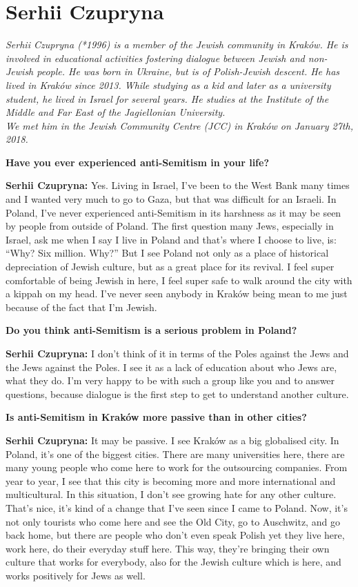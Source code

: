 \section{Serhii Czupryna}

\textit{Serhii Czupryna (*1996) is a member of the Jewish community in Kraków. He is involved in educational activities fostering dialogue between Jewish and non-Jewish people. He was born in Ukraine, but is of Polish-Jewish descent. He has lived in Kraków since 2013. While studying as a kid and later as a university student, he lived in Israel for several years. He studies at the Institute of the Middle and Far East of the Jagiellonian University. \\
We met him in the Jewish Community Centre (JCC) in Kraków on January 27th, 2018.}\par
\vspace*{2em}
\textbf{Have you ever experienced anti-Semitism in your life?}\par
\textbf{Serhii Czupryna:} Yes. Living in Israel, I’ve been to the West Bank many times and I wanted very much to go to Gaza, but that was difficult for an Israeli. In Poland, I’ve never experienced anti-Semitism in its harshness as it may be seen by people from outside of Poland. The first question many Jews, especially in Israel, ask me when I say I live in Poland and that’s where I choose to live, is: ``Why? Six million. Why?'' But I see Poland not only as a place of historical depreciation of Jewish culture, but as a great place for its revival. I feel super comfortable of being Jewish in here, I feel super safe to walk around the city with a kippah on my head. I’ve never seen anybody in Kraków being mean to me just because of the fact that I’m Jewish. \par
\textbf{Do you think anti-Semitism is a serious problem in Poland?}\par 
\textbf{Serhii Czupryna:} I don’t think of it in terms of the Poles against the Jews and the Jews against the Poles. I see it as a lack of education about who Jews are, what they do. I’m very happy to be with such a group like you and to answer questions, because dialogue is the first step to get to understand another culture. \par
\textbf{Is anti-Semitism in Kraków more passive than in other cities?}\par
\textbf{Serhii Czupryna:} It may be passive. I see Kraków as a big globalised city. In Poland, it’s one of the biggest cities. There are many universities here, there are many young people who come here to work for the outsourcing companies. From year to year, I see that this city is becoming more and more international and multicultural. In this situation, I don’t see growing hate for any other culture. That’s nice, it's kind of a change that I’ve seen since I came to Poland. Now, it’s not only tourists who come here and see the Old City, go to Auschwitz, and go back home, but there are people who don’t even speak Polish yet they live here, work here, do their everyday stuff here. This way, they’re bringing their own culture that works for everybody, also for the Jewish culture which is here, and works positively for Jews as well.\par 
